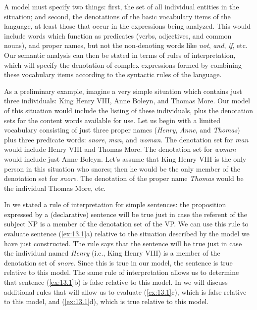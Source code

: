 A model must specify two things: first, the set of all individual entities in the situation; and second, the denotations of the basic vocabulary items of the language, at least those that occur in the expressions being analyzed. This would include words which function as predicates (verbs, adjectives, and common nouns), and proper names, but not the non-denoting words like \textit{not}, \textit{and}, \textit{if}, etc. Our semantic analysis can then be stated in terms of rules of interpretation, which will specify the denotation of complex expressions formed by combining these vocabulary items according to the syntactic rules of the language.



As a preliminary example, imagine a very simple situation which contains just three individuals: King Henry VIII, Anne Boleyn, and Thomas More. Our model of this situation would include the listing of these individuals, plus the denotation sets for the content words available for use. Let us begin with a limited vocabulary consisting of just three proper names (\textit{Henry}, \textit{Anne}, and \textit{Thomas}) plus three predicate words: \textit{snore}, \textit{man}, and \textit{woman}. The denotation set for \textit{man} would include Henry VIII and Thomas More. The denotation set for \textit{woman} would include just Anne Boleyn. Let’s assume that King Henry VIII is the only person in this situation who snores; then he would be the only member of the denotation set for \textit{snore}. The denotation of the proper name \textit{Thomas} would be the individual Thomas More, etc.



In  we stated a rule of interpretation for simple sentences: the proposition expressed by a (declarative) sentence will be true just in case the referent of the subject NP is a member of the denotation set of the VP. We can use this rule to evaluate sentence (\ref{ex:13.1}a) relative to the situation described by the model we have just constructed. The rule says that the sentence will be true just in case the individual named \textit{Henry} (i.e., King Henry VIII) is a member of the denotation set of \textit{snore}. Since this is true in our model, the sentence is true relative to this model. The same rule of interpretation allows us to determine that sentence (\ref{ex:13.1}b) is false relative to this model. In  we will discuss additional rules that will allow us to evaluate (\ref{ex:13.1}c), which is false relative to this model, and (\ref{ex:13.1}d), which is true relative to this model.


